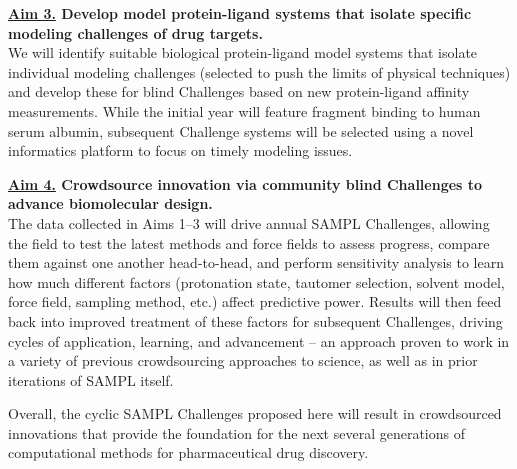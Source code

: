 \documentclass[11pt]{article}
\begin{document}
{\bf \underline{Aim 3.} Develop model protein-ligand systems that isolate specific modeling challenges of drug targets.}\\
We will identify suitable biological protein-ligand model systems that isolate individual modeling challenges (selected to push the limits of physical techniques) and develop these for blind Challenges based on new protein-ligand affinity measurements.
While the initial year will feature fragment binding to human serum albumin, subsequent Challenge systems will be selected using a novel informatics platform to focus on timely modeling issues.

{\bf \underline{Aim 4.} Crowdsource innovation via community blind Challenges to advance biomolecular design.} \\
The data collected in Aims 1--3 will drive annual SAMPL Challenges, allowing the field to test the latest methods and force fields to assess progress, compare them against one another head-to-head, and perform sensitivity analysis to learn how much different factors (protonation state, tautomer selection, solvent model, force field, sampling method, etc.) affect predictive power. 
Results will then feed back into improved treatment of these factors for subsequent Challenges, driving cycles of application, learning, and advancement -- an approach proven to work in a variety of previous crowdsourcing approaches to science, as well as in prior iterations of  SAMPL itself.

Overall, the cyclic SAMPL Challenges proposed here will result in crowdsourced innovations that provide the foundation for the next several generations of computational methods for pharmaceutical drug discovery. 



\end{document}
